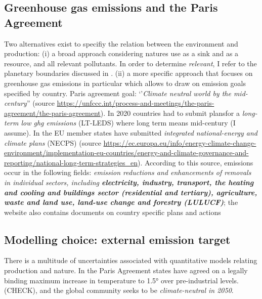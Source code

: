 \subsection{Greenhouse gas emissions and the Paris Agreement}

Two alternatives exist to specifiy the relation between the environment and production: (i) a broad approach considering natures use as a sink and as a resource, and all relevant pollutants. 
In order to determine \textit{relevant}, I refer to the planetary boundaries discussed in \cite{Rockstrom2009AHumanity}. (ii) a more specific approach that focuses on greenhouse gas emissions in particular which allows to draw on emission goals specified by country. Paris agreement goal: `'\textit{Climate neutral world by the mid-century}'' (source \url{https://unfccc.int/process-and-meetings/the-paris-agreement/the-paris-agreement}). In 2020 countries had to submit plansfor a \textit{long-term low ghg emissions} (LT-LEDS) where long term means mid-century (I assume). In the EU member states have submitted \textit{integrated national-energy and climate plans} (NECPS) (source \url{https://ec.europa.eu/info/energy-climate-change-environment/implementation-eu-countries/energy-and-climate-governance-and-reporting/national-long-term-strategies_en}). According to this source, emissions occur in the following fields: 
\textit{emission reductions and enhancements of removals in individual sectors, including \textbf{electricity, industry, transport, the heating and cooling and buildings sector (residential and tertiary), agriculture, waste and land use, land-use change and forestry (LULUCF)}}; the website also contains documents on country specific plans and actions

\subsection{Modelling choice: external emission target}
There is a multitude of uncertainties associated with quantitative models relating production and nature. 
In the Paris Agreement states have agreed on a legally binding maximum increase in temperature to 1.5° over pre-industrial levels. (CHECK), and the global community seeks to be \textit{climate-neutral in 2050}. 


